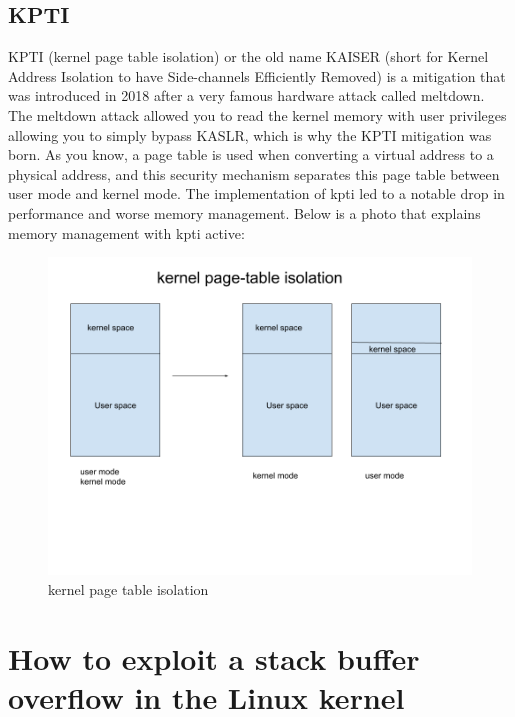    \subsection{KPTI}
    KPTI (kernel page table isolation) or the old name KAISER (short for Kernel Address Isolation to have Side-channels Efficiently Removed) is a mitigation that was introduced in 2018 after a very famous hardware attack called meltdown.\newline
    The meltdown attack allowed you to read the kernel memory with user privileges allowing you to simply bypass KASLR, which is why the KPTI mitigation was born.\newline
    As you know, a page table is used when converting a virtual address to a physical address, and this security mechanism separates this page table between user mode and kernel mode.\newline
    The implementation of kpti led to a notable drop in performance and worse memory management.\newline
    Below is a photo that explains memory management with kpti active: \newline
    \begin{figure}[htbp]
        \centering
        \includegraphics[width=1\linewidth]{Images/kpti.png}
        \caption{kernel page table isolation}
        \label{fig:enter-label}
    \end{figure}
    \clearpage
    \section{How to exploit a stack buffer overflow in the Linux kernel}
